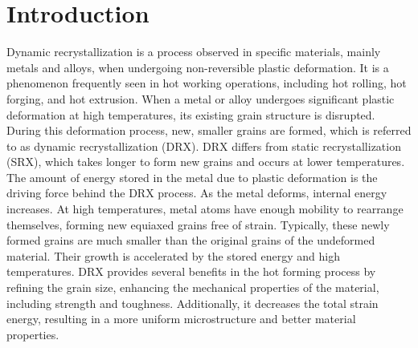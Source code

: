 \documentclass[metals,article,submit,pdftex,moreauthors]{Definitions/mdpi}
\begin{document}
\section{Introduction\label{sec:Introduction}}

Dynamic recrystallization is a process observed in specific materials, mainly metals and alloys, when undergoing non-reversible plastic deformation.
It is a phenomenon frequently seen in hot working operations, including hot rolling, hot forging, and hot extrusion.
When a metal or alloy undergoes significant plastic deformation at high temperatures, its existing grain structure is disrupted.
During this deformation process, new, smaller grains are formed, which is referred to as dynamic recrystallization (DRX).
DRX differs from static recrystallization (SRX), which takes longer to form new grains and occurs at lower temperatures.
The amount of energy stored in the metal due to plastic deformation is the driving force behind the DRX process.
As the metal deforms, internal energy increases.
At high temperatures, metal atoms have enough mobility to rearrange themselves, forming new equiaxed grains free of strain.
Typically, these newly formed grains are much smaller than the original grains of the undeformed material.
Their growth is accelerated by the stored energy and high temperatures.
DRX provides several benefits in the hot forming process by refining the grain size, enhancing the mechanical properties of the material, including strength and toughness.
Additionally, it decreases the total strain energy, resulting in a more uniform microstructure and better material properties.
\end{document}
